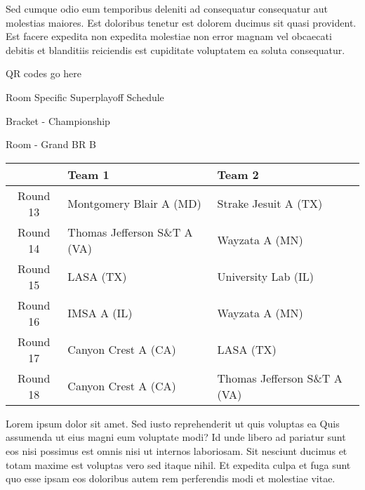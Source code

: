 \documentclass{article}%
\begin{document}
\newline%
Sed cumque odio eum temporibus deleniti ad consequatur consequatur aut molestias maiores. Est doloribus tenetur est dolorem ducimus sit quasi provident. Est facere expedita non expedita molestiae non error magnam vel obcaecati debitis et blanditiis reiciendis est cupiditate voluptatem ea soluta consequatur.%
\vspace*{140pt}%
\begin{center}%
\begin{Huge}%
QR codes go here%
\end{Huge}%
\end{center}%
\newpage%
\begin{center}%
\begin{Huge}%
Room Specific Superplayoff Schedule%
\end{Huge}%
\vspace*{8pt}%
\linebreak%
\begin{Large}%
Bracket {-} Championship%
\end{Large}%
\vspace*{8pt}%
\linebreak%
\vspace*{8pt}%
\begin{Large}%
Room {-} Grand BR B%
\end{Large}%
\end{center}%
%
\begin{tabularx}{\textwidth}{|c|Y|Y|}%
\hline%
&Team 1&Team 2\\%
\hline%
Round 13&Montgomery Blair A (MD)&Strake Jesuit A (TX)\\%
Round 14&Thomas Jefferson S\&T A (VA)&Wayzata A (MN)\\%
Round 15&LASA (TX)&University Lab (IL)\\%
Round 16&IMSA A (IL)&Wayzata A (MN)\\%
Round 17&Canyon Crest A (CA)&LASA (TX)\\%
Round 18&Canyon Crest A (CA)&Thomas Jefferson S\&T A (VA)\\%
\hline%
\end{tabularx}%
\vspace*{8pt}%
\newline%
Lorem ipsum dolor sit amet. Sed iusto reprehenderit ut quis voluptas ea Quis assumenda ut eius magni eum voluptate modi? Id unde libero ad pariatur sunt eos nisi possimus est omnis nisi ut internos laboriosam. Sit nesciunt ducimus et totam maxime est voluptas vero sed itaque nihil. Et expedita culpa et fuga sunt quo esse ipsam eos doloribus autem rem perferendis modi et molestiae vitae.\newline%
\end{document}
